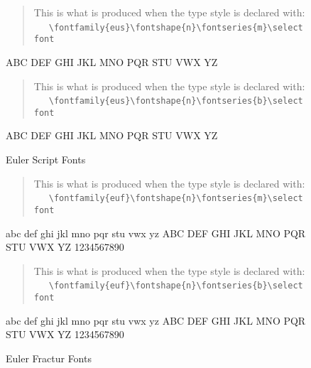 \begin{figure}
\begin{singlespace}
\begin{verse}
This is what is produced when the type style is declared with:\\
\ \ \ \verb+\fontfamily{eus}\fontshape{n}\fontseries{m}\selectfont+\\
\end{verse}
{\selectfont
ABC DEF GHI JKL MNO PQR STU VWX YZ\par}
\vspace{1em}
\begin{verse}
This is what is produced when the type  style is declared with:\\
\ \ \ \verb+\fontfamily{eus}\fontshape{n}\fontseries{b}\selectfont+\\
\end{verse}
{\selectfont
ABC DEF GHI JKL MNO PQR STU VWX YZ\par}
\vspace{1em}
\caption{Euler Script Fonts}
\label{fig:eus}
\end{singlespace}
\end{figure}
 
\begin{figure}
\begin{singlespace}
\begin{verse}
This is what is produced when the type  style is declared with:\\
\ \ \ \verb+\fontfamily{euf}\fontshape{n}\fontseries{m}\selectfont+\\
\end{verse}
{\selectfont
abc def ghi jkl mno pqr stu vwx yz ABC DEF GHI JKL MNO PQR STU
VWX YZ 1234567890\par}
\vspace{1em}
\begin{verse}
This is what is produced when the type  style is declared with:\\
\ \ \ \verb+\fontfamily{euf}\fontshape{n}\fontseries{b}\selectfont+\\
\end{verse}
{\selectfont
abc def ghi jkl mno pqr stu vwx yz ABC DEF GHI JKL MNO PQR STU
VWX YZ 1234567890\par}
\vspace{1em}
\caption{Euler Fractur Fonts}
\label{fig:euf}
\end{singlespace}
\end{figure}
 
